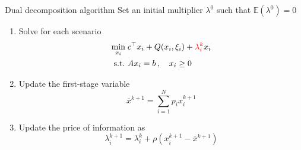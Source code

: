 \begin{frame}{Dual decomposition algorithm}
Set an initial multiplier $\lambda^0$ such that $\mathbb{E}(\lambda^0) = 0$
  \begin{enumerate}
    \item Solve for each scenario
      \begin{equation*}
        \begin{aligned}
          \min_{x_i} \; & c^\top x_i + Q(x_i, \xi_i) + {\color{red}\lambda_i^k}x_i \\
          \mbox{s.t.}~ & A x_i = b\, , \quad x_i \geq 0
        \end{aligned}
      \end{equation*}
    \item Update the first-stage variable
      \begin{equation*}
        \overline{x}^{k+1} = \sum_{i=1}^N p_i x_i^{k+1}
      \end{equation*}
    \item Update the price of information as
      \begin{equation*}
        \lambda^{k+1}_i = \lambda^k_i + \rho (x_i^{k+1} - \overline{x}^{k+1})
      \end{equation*}
  \end{enumerate}


\end{frame}


